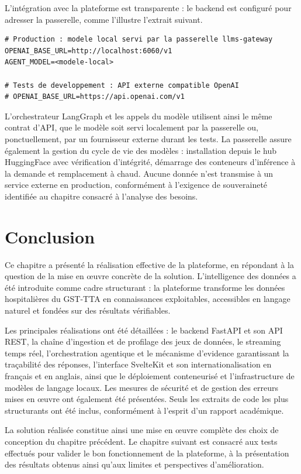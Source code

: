 L'intégration avec la plateforme est transparente : le backend est configuré pour adresser la passerelle, comme l'illustre l'extrait suivant.

\begin{lstlisting}[caption={Configuration de l'accès au modèle (extrait de \texttt{.env})}]
# Production : modele local servi par la passerelle llms-gateway
OPENAI_BASE_URL=http://localhost:6060/v1
AGENT_MODEL=<modele-local>

# Tests de developpement : API externe compatible OpenAI
# OPENAI_BASE_URL=https://api.openai.com/v1
\end{lstlisting}

L'orchestrateur LangGraph et les appels du modèle utilisent ainsi le même contrat d'API, que le modèle soit servi localement par la passerelle ou, ponctuellement, par un fournisseur externe durant les tests. La passerelle assure également la gestion du cycle de vie des modèles : installation depuis le hub HuggingFace avec vérification d'intégrité, démarrage des conteneurs d'inférence à la demande et remplacement à chaud. Aucune donnée n'est transmise à un service externe en production, conformément à l'exigence de souveraineté identifiée au chapitre consacré à l'analyse des besoins.

\section{Conclusion}

Ce chapitre a présenté la réalisation effective de la plateforme, en répondant à la question de la mise en œuvre concrète de la solution. L'intelligence des données a été introduite comme cadre structurant : la plateforme transforme les données hospitalières du GST-TTA en connaissances exploitables, accessibles en langage naturel et fondées sur des résultats vérifiables.

Les principales réalisations ont été détaillées : le backend FastAPI et son API REST, la chaîne d'ingestion et de profilage des jeux de données, le streaming temps réel, l'orchestration agentique et le mécanisme d'evidence garantissant la traçabilité des réponses, l'interface SvelteKit et son internationalisation en français et en anglais, ainsi que le déploiement conteneurisé et l'infrastructure de modèles de langage locaux. Les mesures de sécurité et de gestion des erreurs mises en œuvre ont également été présentées. Seuls les extraits de code les plus structurants ont été inclus, conformément à l'esprit d'un rapport académique.

La solution réalisée constitue ainsi une mise en œuvre complète des choix de conception du chapitre précédent. Le chapitre suivant est consacré aux tests effectués pour valider le bon fonctionnement de la plateforme, à la présentation des résultats obtenus ainsi qu'aux limites et perspectives d'amélioration.

